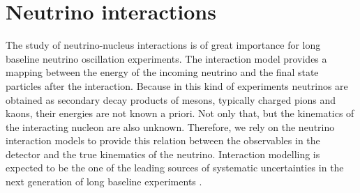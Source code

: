 \section{Neutrino interactions}\label{sec:nu_interactions}

The study of neutrino-nucleus interactions is of great importance for long baseline neutrino oscillation experiments. The interaction model provides a mapping between the energy of the incoming neutrino and the final state particles after the interaction. Because in this kind of experiments neutrinos are obtained as secondary decay products of mesons, typically charged pions and kaons, their energies are not known a priori. Not only that, but the kinematics of the interacting nucleon are also unknown. Therefore, we rely on the neutrino interaction models to provide this relation between the observables in the detector and the true kinematics of the neutrino. Interaction modelling is expected to be the one of the leading sources of systematic uncertainties in the next generation of long baseline experiments \cite{Coloma2013,Coloma2013a,Mosel2016}.

